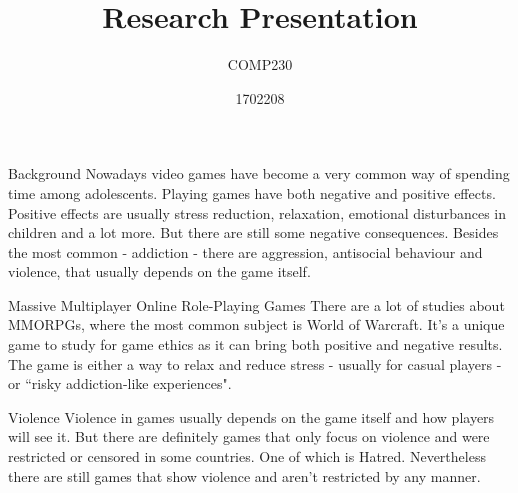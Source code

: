 \documentclass{beamer}
\title{Research Presentation}
\subtitle{COMP230}
\author{1702208}
\begin{document}
\begin{frame}
	\maketitle
\end{frame}

\begin{frame}{Background}
	Nowadays video games have become a very common way of spending time among adolescents. Playing games have both negative and positive effects. Positive effects are usually stress reduction\cite{russoniello2009effectiveness}, relaxation\cite{wack2009relationships}, emotional disturbances in children\cite{jones2014gaming}\cite{hull2009computer} and a lot more. But there are still some negative consequences. Besides the most common - addiction - there are aggression, antisocial behaviour and violence, that usually depends on the game itself.
\end{frame}

\begin{frame}{Massive Multiplayer Online Role-Playing Games}
	There are a lot of studies about MMORPGs, where the most common subject is World of Warcraft. It's a unique game to study for game ethics as it can bring both positive and negative results. The game is either a way to relax and reduce stress - usually for casual players - or ``risky addiction-like experiences"\cite{snodgrass2011magical}. 
\end{frame}

\begin{frame}{Violence}
	Violence in games usually depends on the game itself and how players will see it. But there are definitely games that only focus on violence and were restricted or censored in some countries. One of which is Hatred. Nevertheless there are still games that show violence and aren't restricted by any manner.
\end{frame}
\end{document}
